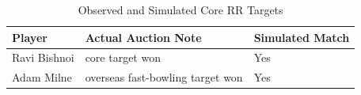 \begin{table}[H]
\centering
\caption{Observed and Simulated Core RR Targets}
\begin{tabular}{lll}
\toprule
Player & Actual Auction Note & Simulated Match \\
\midrule
Ravi Bishnoi & core target won & Yes \\
Adam Milne & overseas fast-bowling target won & Yes \\
\bottomrule
\end{tabular}
\end{table}
